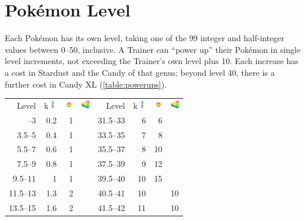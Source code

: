 \section{Pokémon Level}
\label{sec:plevel}
Each Pokémon has its own level, taking one of the 99 integer and half-integer
 values between 0--50, inclusive.
A Trainer can ``power up'' their Pokémon in single level increments,
 not exceeding the Trainer's own level plus 10.
Each increase has a cost in Stardust and the Candy of that genus; beyond level 40, there
  is a further cost in Candy XL (\autoref{table:powerups}).
\begin{table}
  \begin{center}
    \begin{tabular}[ht]{rrrr|rrrr}
      Level &
        k\includegraphics[width=1em,height=1em]{images/stardust.png} &
        \includegraphics[width=1em,height=1em]{images/rarecandy.png} &
        \includegraphics[width=1em,height=1em]{images/rarecandyxl.png} &
      Level &
        k\includegraphics[width=1em,height=1em]{images/stardust.png} &
        \includegraphics[width=1em,height=1em]{images/rarecandy.png} &
        \includegraphics[width=1em,height=1em]{images/rarecandyxl.png} \\
      \Midrule
      1.5--3 & 0.2 & 1 & & 31.5--33 &   6 &  6 & \\
      3.5--5 & 0.4 & 1 & & 33.5--35 &   7 &  8 & \\
      5.5--7 & 0.6 & 1 & & 35.5--37 &   8 & 10 & \\
      7.5--9 & 0.8 & 1 & & 37.5--39 &   9 & 12 & \\
     9.5--11 &   1 & 1 & & 39.5--40 &  10 & 15 & \\
    11.5--13 & 1.3 & 2 & & 40.5--41 &  10 &    & 10 \\
    13.5--15 & 1.6 & 2 & & 41.5--42 &  11 &    & 10 \\

\end{tabular}
\end{center}
\end{table}
